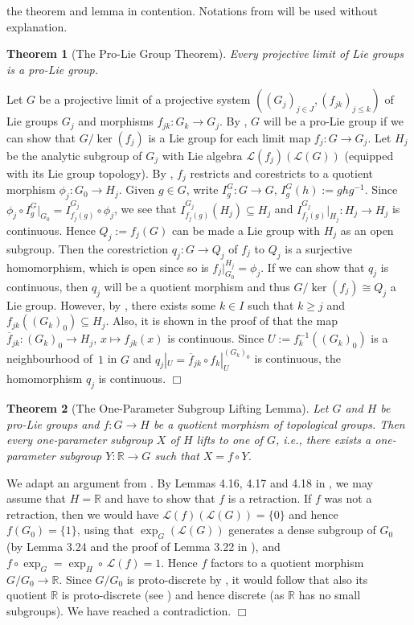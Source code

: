 \documentclass[12pt]{article}
\newtheorem{thm}{Theorem}
\newenvironment{proof}{{\noindent\bf Proof.}}%
                  {\nopagebreak\hspace*{\fill}$\Box$\medskip\medskip\par}
\newcommand{\wb}{\overline}
\newcommand{\mto}{\mapsto}
\newcommand{\R}{{\mathbb R}}
\newcommand{\cL}{{\mathcal L}}
\newcommand{\sub}{\subseteq}
\begin{document}
the theorem and lemma in contention.
Notations from \cite{HaM}
will be used without explanation.
%
\begin{thm}[The Pro-Lie Group Theorem]
Every projective limit of Lie groups
is a pro-Lie group.
\end{thm}
%
%
\begin{proof}
Let $G$ be a projective limit of
a projective system $((G_j)_{j\in J},(f_{jk})_{j\leq k})$
of Lie groups $G_j$ and morphisms $f_{jk}\colon G_k\to G_j$.
By \cite[Proposition 3.27]{HaM}, $G$
will be a pro-Lie group if we can show that
$G/\ker(f_j)$
is a Lie group for each limit map
$f_j\colon G\to G_j$. Let $H_j$ be the analytic subgroup
of $G_j$ with Lie algebra $\cL(f_j)(\cL(G))$
(equipped with its Lie group topology).
By \cite[Lemmas 3.23 and 3.24]{HaM}, $f_j$ restricts
and corestricts to a quotient morphism $\phi_j\colon G_0\to H_j$.
Given $g\in G$, write $I_g^G\colon G\to G$, $I_g^G(h):=ghg^{-1}$.
Since $\phi_j\circ I_g^G|_{G_0}=I_{f_j(g)}^{G_j}\circ \phi_j$,
we see that $I_{f_j(g)}^{G_j}(H_j)\subseteq H_j$ and
$I_{f_j(g)}^{G_j}|_{H_j}\colon H_j\to H_j$ is continuous.
Hence $Q_j:=f_j(G)$ can be made a Lie group with $H_j$
as an open subgroup. Then the corestriction $q_j\colon G\to Q_j$
of $f_j$ to $Q_j$ is a surjective homomorphism, which is open
since so is $f_j|_{G_0}^{H_j}=\phi_j$. If we can show that $q_j$
is continuous, then $q_j$ will be a quotient morphism
and thus $G/\ker(f_j)\cong Q_j$ a Lie group.
However, by \cite[Lemma 3.21]{HaM}, there exists some
$k\in I$ such that $k\geq j$ and $f_{jk}((G_k)_0)\sub
H_j$. Also, it is shown in the proof
of \cite[Lemma 3.24]{HaM} that 
the map
$\wb{f}_{jk}\colon (G_k)_0\to H_j$, $x\mto f_{jk}(x)$
is continuous. Since $U:=f_k^{-1}((G_k)_0)$
is a neighbourhood \mbox{of $1$} in $G$
and $q_j|_U\!=\!\wb{f}_{jk}\!\circ\! f_k|_U^{(G_k)_0}$
is continuous, the homomorphism $q_j$ is
continuous.
\end{proof}
%
%
%
\begin{thm}[The One-Parameter Subgroup Lifting Lemma]
Let $G$ and $H$ be pro-Lie groups and
$f\colon G\to H$ be a quotient morphism
of topological groups.
Then every one-parameter subgroup $X$
of $H$ lifts to one of $G$, i.e., 
there exists a one-parameter subgroup
$Y\colon \R\to G$ such that $X=f \circ Y$.
\end{thm}
%
\begin{proof}
We adapt an argument from \cite[p.\,193]{HaM}.
By Lemmas 4.16, 4.17 and 4.18 in \cite{HaM},
we may assume that $H=\R$ and have to show
that $f$ is a retraction. If $f$ was not a retraction,
then we would have $\cL(f)(\cL(G))=\{0\}$
and hence $f(G_0)=\{1\}$, using that
$\exp_G(\cL(G))$ generates a dense
subgroup of $G_0$
(by Lemma 3.24 and the proof of Lemma 3.22 in \cite{HaM}),
and $f\circ \exp_G=\exp_H\circ \, \cL(f)=1$.
Hence $f$ factors to a quotient morphism
$G/G_0\to \R$.
Since $G/G_0$ is proto-discrete
by \cite[Lemma 3.31]{HaM}, it would follow
that also its quotient $\R$ is proto-discrete
(see \cite[Proposition 3.30\,(b)]{HaM})
and hence discrete (as $\R$ has no small
subgroups). We have reached a contradiction.
\end{proof}
\end{document}
